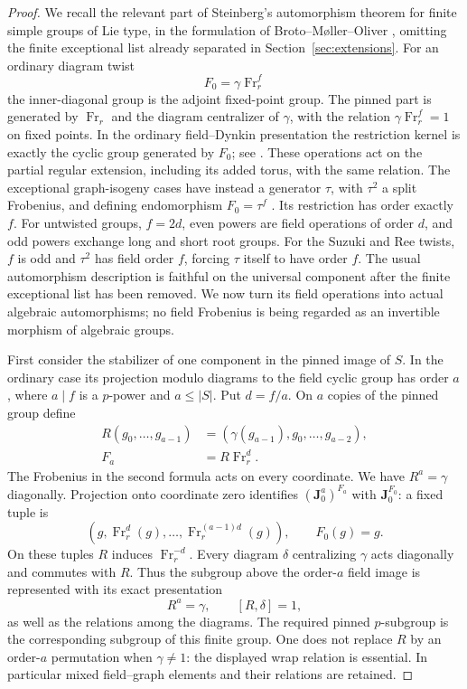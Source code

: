 \begin{proof}
We recall the relevant part of Steinberg's automorphism theorem
\cite{SteinbergAutomorphisms} for finite simple groups of Lie type,
in the formulation of Broto--M\o ller--Oliver
\cite[Definition~3.3 and Theorem~3.4]{BMO}, omitting the finite exceptional
list already separated in Section~\ref{sec:extensions}.  For an ordinary
diagram twist
\[
 F_0=\gamma\operatorname{Fr}_r^f
\]
the inner-diagonal group is the adjoint fixed-point group.  The pinned
part is generated by $\operatorname{Fr}_r$ and the diagram centralizer
of $\gamma$, with the relation
$\gamma\operatorname{Fr}_r^f=1$ on fixed points.  In the ordinary
field--Dynkin presentation the restriction kernel is exactly the
cyclic group generated by $F_0$; see \cite[\S2.2]{SpaethD}.  These operations act
on the partial regular extension, including its added torus, with the
same relation.  The exceptional graph-isogeny cases have instead a
generator $\tau$, with $\tau^2$ a split Frobenius, and defining
endomorphism $F_0=\tau^f$ \cite[Definition~3.1]{BMO}.  Its restriction
has order exactly $f$.  For untwisted groups, $f=2d$, even powers are
field operations of order $d$, and odd powers exchange long and short
root groups.  For the Suzuki and Ree twists, $f$ is odd and $\tau^2$
has field order $f$, forcing $\tau$ itself to have order $f$.
The usual automorphism description is
faithful on the universal component after the finite exceptional list
has been removed.  We now turn its field operations into actual
algebraic automorphisms; no field Frobenius is being regarded as an
invertible morphism of algebraic groups.

First consider the stabilizer of one component in the pinned image of
$S$.  In the ordinary case its projection modulo diagrams to the field
cyclic group has order $a$, where $a\mid f$ is a $p$-power and
$a\leq |S|$.  Put $d=f/a$.  On $a$ copies of the pinned group define
\begin{align*}
 R(g_0,\ldots,g_{a-1})
    &=(\gamma(g_{a-1}),g_0,\ldots,g_{a-2}),\\
 F_a&=R\operatorname{Fr}_r^d.
\end{align*}
The Frobenius in the second formula acts on every coordinate.  We have
$R^a=\gamma$ diagonally.  Projection onto coordinate zero identifies
$(\mathbf J_0^a)^{F_a}$ with $\mathbf J_0^{F_0}$: a fixed tuple is
\[
 (g,\operatorname{Fr}_r^d(g),\ldots,
       \operatorname{Fr}_r^{(a-1)d}(g)),
 \qquad F_0(g)=g.
\]
On these tuples $R$ induces $\operatorname{Fr}_r^{-d}$.
Every diagram $\delta$ centralizing $\gamma$ acts diagonally and
commutes with $R$.  Thus the subgroup above the order-$a$ field image
is represented with its exact presentation
\[
 R^a=\gamma,\qquad [R,\delta]=1,
\]
as well as the relations among the diagrams.  The required pinned
$p$-subgroup is the corresponding subgroup of this finite group.
One does not replace $R$ by an order-$a$ permutation when
$\gamma\ne1$: the displayed wrap relation is essential.  In particular
mixed field--graph elements and their relations are retained.


\end{proof}
